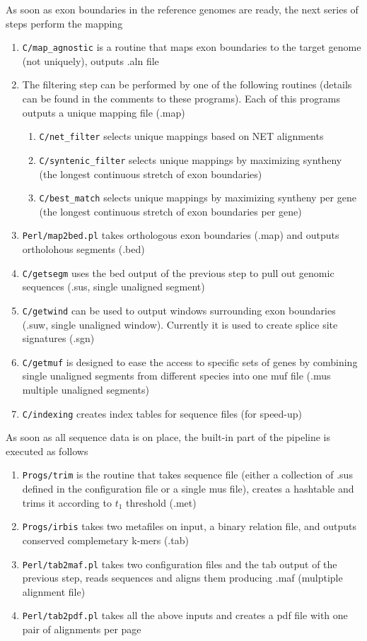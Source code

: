 \documentclass{article}
\begin{document}
As soon as exon boundaries in the reference genomes are ready, the next series of steps perform the mapping
\begin{enumerate}
\item {\tt C/map\_agnostic} is a routine that maps exon boundaries to the target genome (not uniquely), outputs .aln file
\item The filtering step can be performed by one of the following routines (details can be found in the comments to these programs). 
Each of this programs outputs a unique mapping file (.map)
\begin{enumerate}
\item {\tt C/net\_filter} selects unique mappings based on NET alignments
\item {\tt C/syntenic\_filter} selects unique mappings by maximizing syntheny (the longest continuous stretch of exon boundaries)
\item {\tt C/best\_match} selects unique mappings by maximizing syntheny per gene (the longest continuous stretch of exon boundaries per gene)
\end{enumerate}
\item {\tt Perl/map2bed.pl} takes orthologous exon boundaries (.map) and outputs ortholohous segments (.bed)
\item {\tt C/getsegm} uses the bed output of the previous step to pull out genomic sequences (.sus, single unaligned segment) 
\item {\tt C/getwind} can be used to output windows surrounding exon boundaries (.suw, single unaligned window). Currently it is used to create splice site signatures (.sgn)
\item {\tt C/getmuf} is designed to ease the access to specific sets of genes by combining single unaligned segments from different species into one muf file (.mus multiple unaligned segments)
\item {\tt C/indexing} creates index tables for sequence files (for speed-up)
\end{enumerate}

As soon as all sequence data is on place, the built-in part of the pipeline is executed as follows
\begin{enumerate}
\item {\tt Progs/trim} is the routine that takes sequence file (either a collection of .sus defined in the configuration file or a single mus file), 
creates a hashtable and trims it according to $t_1$ threshold (.met)
\item {\tt Progs/irbis} takes two metafiles on input, a binary relation file, and outputs conserved complemetary k-mers (.tab)
\item {\tt Perl/tab2maf.pl} takes two configuration files and the tab output of the previous step, reads sequences and aligns them producing .maf (mulptiple alignment file)
\item {\tt Perl/tab2pdf.pl} takes all the above inputs and creates a pdf file with one pair of alignments per page
\end{enumerate}
\end{document}
